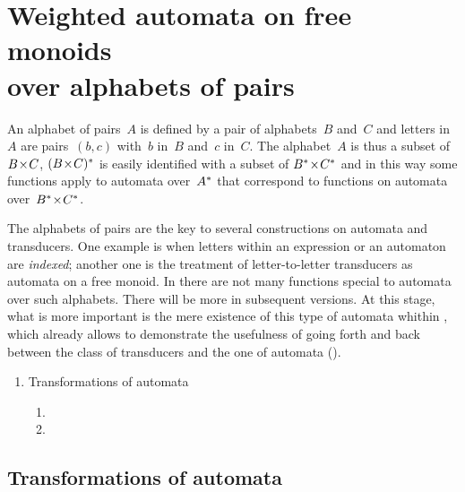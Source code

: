 

\section{Weighted automata on free monoids \protect\\
\eee over alphabets of pairs}
\label{sec:alp-pai}


An alphabet of pairs~$A$ is defined by a pair of alphabets~$B$ and~$C$
and letters in~$A$ are pairs~$(b,c)$ with~$b$ in~$B$ and~$c$ in~$C$. 
The alphabet~$A$ is thus a subset
of~$B\! \times \! C$, $(B\! \times \! C)^{*}$ is easily identified with a subset of 
${{B}^{*}}\! \times \!{{C}^{*}}$ and in this way
some functions apply to automata over~${{A}^{*}}$ that correspond to functions on
automata over~${{B}^{*}}\! \times \!{{C}^{*}}$.

The alphabets of pairs are the key to several constructions on 
automata and transducers.
One example is when letters within an expression or an automaton are 
\emph{indexed}; another one is the treatment of letter-to-letter 
transducers as automata on a free monoid.
In \tafkitv there are not many functions special to automata 
over such alphabets. 
There will be more in subsequent versions.
At this stage, what is more important is the mere existence of this 
type of automata whithin \tafkit, which already allows to demonstrate the 
usefulness of going forth and back between the class of transducers 
and the one of automata (\cf {}). 

\renewcommand{\theenumii}{\theenumi.\arabic{enumii}}

\begin{enumerate}

\item Transformations of automata

\begin{enumerate}
\item {}\vrglst {} 
\item {}
\end{enumerate}

\end{enumerate}


\subsection{Transformations of automata}

